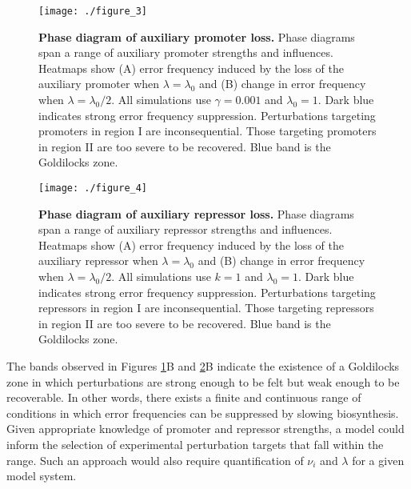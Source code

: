 \begin{figure}[h!]
\centering
\texttt{[image: ./figure\_3]}
\caption[Phase diagram of auxiliary promoter loss.]{\textbf{Phase diagram of auxiliary promoter loss.} 
Phase diagrams span a range of auxiliary promoter strengths and influences. Heatmaps show (A) error frequency induced by the loss of the auxiliary promoter when $\lambda = \lambda_0$ and (B) change in error frequency when $\lambda = \lambda_0 / 2$. All simulations use $\gamma = 0.001$ and $\lambda_0 = 1$. Dark blue indicates strong error frequency suppression. Perturbations targeting promoters in region I are inconsequential. Those targeting promoters in region II are too severe to be recovered. Blue band is the Goldilocks zone.}
\label{fig:conc:fig3}
\end{figure}

\begin{figure}[h!]
\centering
\texttt{[image: ./figure\_4]}
\caption[Phase diagram of auxiliary repressor loss.]{\textbf{Phase diagram of auxiliary repressor loss.} 
Phase diagrams span a range of auxiliary repressor strengths and influences. Heatmaps show (A) error frequency induced by the loss of the auxiliary repressor when $\lambda = \lambda_0$ and (B) change in error frequency when $\lambda = \lambda_0 / 2$. All simulations use $k = 1$ and $\lambda_0 = 1$. Dark blue indicates strong error frequency suppression. Perturbations targeting repressors in region I are inconsequential. Those targeting repressors in region II are too severe to be recovered. Blue band is the Goldilocks zone.}
\label{fig:conc:fig4}
\end{figure}

The bands observed in Figures \ref{fig:conc:fig3}B and \ref{fig:conc:fig4}B indicate the existence of a Goldilocks zone in which perturbations are strong enough to be felt but weak enough to be recoverable. In other words, there exists a finite and continuous range of conditions in which error frequencies can be suppressed by slowing biosynthesis. Given appropriate knowledge of promoter and repressor strengths, a model could inform the selection of experimental perturbation targets that fall within the range. Such an approach would also require quantification of $\nu_i$ and $\lambda$ for a given model system.

